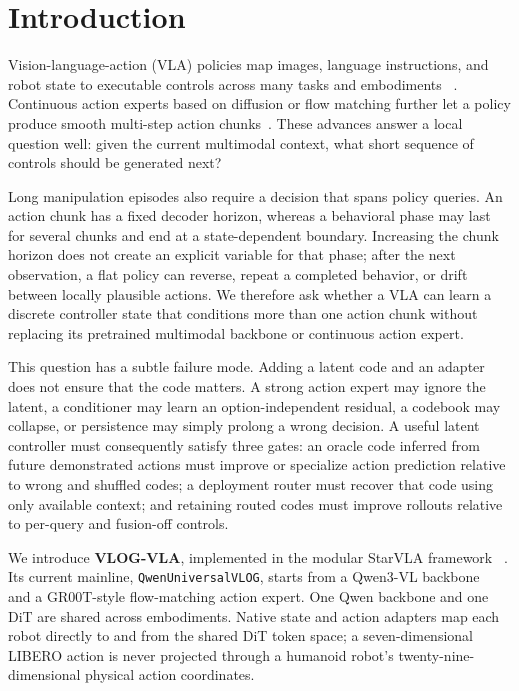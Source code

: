 \section{Introduction}

Vision-language-action (VLA) policies map images, language instructions, and
robot state to executable controls across many tasks and embodiments
~\citep{brohan2022rt1,brohan2023rt2,kim2024openvla,black2024pi0}.  Continuous
action experts based on diffusion or flow matching further let a policy produce
smooth multi-step action chunks~\citep{chi2023diffusion,black2024pi0,bjorck2025groot}.
These advances answer a local question well: given the current multimodal
context, what short sequence of controls should be generated next?

Long manipulation episodes also require a decision that spans policy queries.
An action chunk has a fixed decoder horizon, whereas a behavioral phase may
last for several chunks and end at a state-dependent boundary.  Increasing the
chunk horizon does not create an explicit variable for that phase; after the
next observation, a flat policy can reverse, repeat a completed behavior, or
drift between locally plausible actions.  We therefore ask whether a VLA can
learn a discrete controller state that conditions more than one action chunk
without replacing its pretrained multimodal backbone or continuous action
expert.

This question has a subtle failure mode.  Adding a latent code and an adapter
does not ensure that the code matters.  A strong action expert may ignore the
latent, a conditioner may learn an option-independent residual, a codebook may
collapse, or persistence may simply prolong a wrong decision.  A useful latent
controller must consequently satisfy three gates: an oracle code inferred from
future demonstrated actions must improve or specialize action prediction
relative to wrong and shuffled codes; a deployment router must recover that
code using only available context; and retaining routed codes must improve
rollouts relative to per-query and fusion-off controls.

We introduce \textbf{VLOG-VLA}, implemented in the modular StarVLA framework
~\citep{community2026starvla}.  Its current mainline, \texttt{QwenUniversalVLOG},
starts from a Qwen3-VL backbone~\citep{bai2025qwen3vl} and a GR00T-style
flow-matching action expert.  One Qwen backbone and one DiT are shared across
embodiments.  Native state and action adapters map each robot directly to and
from the shared DiT token space; a seven-dimensional LIBERO action is never
projected through a humanoid robot's twenty-nine-dimensional physical action
coordinates.

